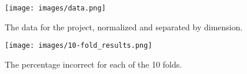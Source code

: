 \begin{figure}[H]
  \centering
		\texttt{[image: images/data.png]}
  \caption{The data for the project, normalized and separated by dimension.}
\end{figure}

\begin{figure}[H]
  \centering
		\texttt{[image: images/10-fold\_results.png]}
  \caption{The percentage incorrect for each of the 10 folds.}
\end{figure}
 






